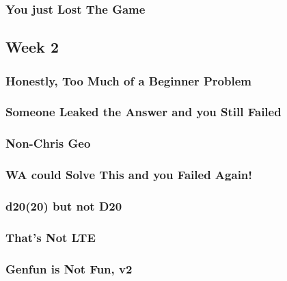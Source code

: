 \documentclass[titlepage=true]{scrartcl}
\begin{document}
    \subsubsection{You just Lost The Game}
	\label{16-1-7}
	
	\newpage
    
    \subsection{Week 2}
    
    \subsubsection{Honestly, Too Much of a Beginner Problem}
	\label{16-2-1}
	
	\newpage

	\subsubsection{Someone Leaked the Answer and you Still Failed}
	\label{16-2-2}
	
	\newpage

    \subsubsection{Non-Chris Geo}
	\label{16-2-3}
	
	\newpage

    \subsubsection{WA could Solve This and you Failed Again!}
	\label{16-2-4}
	
	\newpage

    \subsubsection{d20(20) but not D20}
	\label{16-2-5}
	
	\newpage

    \subsubsection{That's Not LTE}
	\label{16-2-6}
	
	\newpage

	\subsubsection{Genfun is Not Fun, v2}
	\label{16-2-7}
	
	\newpage
\end{document}
